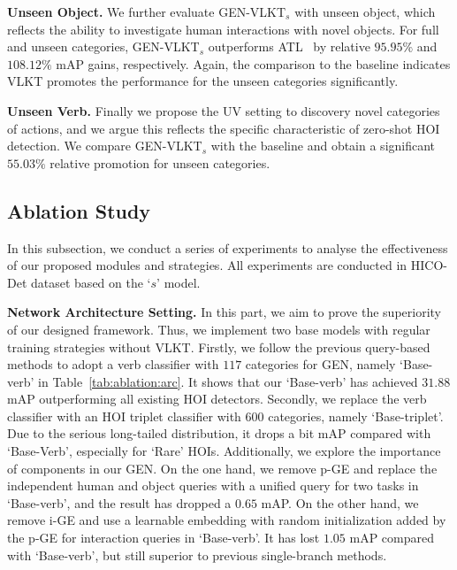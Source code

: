 \documentclass[10pt,twocolumn,letterpaper]{article}
\begin{document}
\vspace{0.5mm}\noindent\textbf{Unseen Object.} We further evaluate GEN-VLKT$_s$ with unseen object, which reflects the ability to investigate human interactions with novel objects. For full and unseen categories, GEN-VLKT$_s$ outperforms ATL~\cite{hou2021affordance} by relative $95.95\%$ and $108.12\%$ mAP gains, respectively. Again, the comparison to the baseline indicates VLKT promotes the performance for the unseen categories significantly.

\vspace{0.5mm}\noindent\textbf{Unseen Verb.} Finally we propose the UV setting to discovery novel categories of actions, and we argue this reflects the specific characteristic of zero-shot HOI detection. We compare GEN-VLKT$_s$ with the baseline and obtain a significant $55.03\%$ relative promotion for unseen categories.

\vspace{-1.5mm}\subsection{Ablation Study}\label{sec:ablation}\vspace{-1.5mm}
In this subsection, we conduct a series of experiments to analyse the effectiveness of our proposed modules and strategies. All experiments are conducted in HICO-Det dataset based on the `$s$' model.

\vspace{0.5mm}\noindent\textbf{Network Architecture Setting.} In this part, we aim to prove the superiority of our designed framework. Thus, we implement two base models with regular training strategies without VLKT. Firstly, we follow the previous query-based methods to adopt a verb classifier with $117$ categories for GEN, namely `Base-verb' in Table~\ref{tab:ablation:arc}. It shows that our `Base-verb' has achieved $31.88$ mAP outperforming all existing HOI detectors. Secondly, we replace the verb classifier with an HOI triplet classifier with $600$ categories, namely `Base-triplet'. Due to the serious long-tailed distribution, it drops a bit mAP compared with `Base-Verb', especially for `Rare' HOIs.
Additionally, we explore the importance of components in our GEN. On the one hand, we remove p-GE and replace the independent human and object queries with a unified query for two tasks in `Base-verb', and the result has dropped a $0.65$ mAP. On the other hand, we remove i-GE and use a learnable embedding with random initialization added by the p-GE for interaction queries in `Base-verb'. It has lost $1.05$ mAP compared with `Base-verb', but still superior to previous single-branch methods. 
\end{document}
